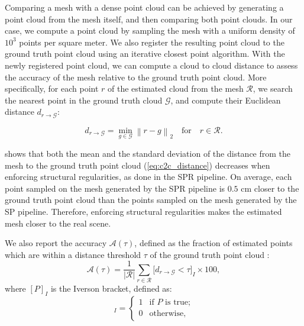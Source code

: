   \label{ssec:map_accuracy}
Comparing a mesh with a dense point cloud can be achieved by generating a point cloud from the mesh itself, and then comparing both point clouds.
In our case, we compute a point cloud by sampling the mesh with a uniform density of $10^3$ points per square meter.
We also register the resulting point cloud to the ground truth point cloud using an iterative closest point algorithm.
%
  With the newly registered point cloud, we can compute a cloud to cloud distance to assess the accuracy of the mesh relative to the ground truth point cloud.
  More specifically, for each point $r$ of the estimated cloud from the mesh $\mathcal{R}$, we search the nearest point in the ground truth cloud $\mathcal{G}$, and compute their Euclidean distance $d_{r \to \mathcal{G}}$:

  \begin{equation}
    \label{eq:c2c_distance}
    d_{r \to \mathcal{G}} = \min_{g \in \mathcal{G}}\left\|{r-g}\right\|_{2} \quad\text{for}\quad r \in \mathcal{R}.
  \end{equation}

   shows that both the mean and the standard deviation of the distance from the mesh to the ground truth point cloud (\cref{eq:c2c_distance}) decreases when enforcing structural regularities, as done in the SPR pipeline.
  On average, each point sampled on the mesh generated by the SPR pipeline is $0.5$ cm closer to the ground truth point cloud than the points sampled on the mesh generated by the SP pipeline.
  Therefore, enforcing structural regularities makes the estimated mesh closer to the real scene.

  We also report the accuracy $\mathcal{A}(\tau)$, defined as the fraction of estimated points which are within a distance threshold $\tau$ of the ground truth point cloud \cite{Schoeps2017cvpr, Knapitsch2017}:
  \begin{equation}
    \label{eq:mesh_accuracy}
    \mathcal{A}(\tau) = \frac{1}{|\mathcal{R}|}\sum_{r \in \mathcal{R}}\bigg[d_{r \to \mathcal{G}} < \tau\bigg]_I \times 100,
  \end{equation}
  where $[P]_I$ is the Iverson bracket, defined as:
  \begin{equation*}
    [P]_I={\begin{cases}
        1&{\text{if }}P{\text{ is true;}}\\
        0&{\text{otherwise,}}
    \end{cases}}
  \end{equation*}

